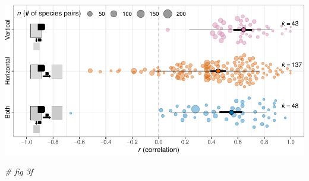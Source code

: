 \documentclass[
]{article}
\newenvironment{Shaded}{\begin{snugshade}}{\end{snugshade}}
\newcommand{\CommentTok}[1]{\textcolor[rgb]{0.56,0.35,0.01}{\textit{#1}}}
\begin{document}
\includegraphics{Supporting_Information_files/figure-latex/unnamed-chunk-34-1.pdf}

\begin{Shaded}
\begin{Highlighting}[]
\CommentTok{# fig 3f}


\end{Highlighting}
\end{Shaded}
\end{document}
